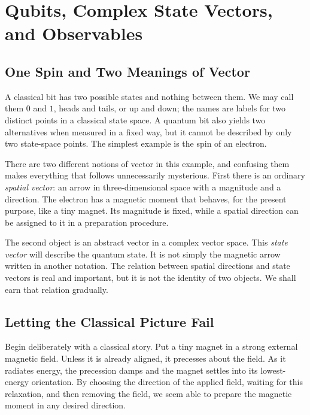 \chapter{Qubits, Complex State Vectors, and Observables}


\section{One Spin and Two Meanings of Vector}

A classical bit has two possible states and nothing between them. We may call them \(0\) and \(1\), heads and tails, or up and down; the names are labels for two distinct points in a classical state space. A quantum bit also yields two alternatives when measured in a fixed way, but it cannot be described by only two state-space points. The simplest example is the spin of an electron.

There are two different notions of vector in this example, and confusing them makes everything that follows unnecessarily mysterious. First there is an ordinary \emph{spatial vector}: an arrow in three-dimensional space with a magnitude and a direction. The electron has a magnetic moment that behaves, for the present purpose, like a tiny magnet. Its magnitude is fixed, while a spatial direction can be assigned to it in a preparation procedure.

The second object is an abstract vector in a complex vector space. This \emph{state vector} will describe the quantum state. It is not simply the magnetic arrow written in another notation. The relation between spatial directions and state vectors is real and important, but it is not the identity of two objects. We shall earn that relation gradually.

\section{Letting the Classical Picture Fail}

Begin deliberately with a classical story. Put a tiny magnet in a strong external magnetic field. Unless it is already aligned, it precesses about the field. As it radiates energy, the precession damps and the magnet settles into its lowest-energy orientation. By choosing the direction of the applied field, waiting for this relaxation, and then removing the field, we seem able to prepare the magnetic moment in any desired direction.

